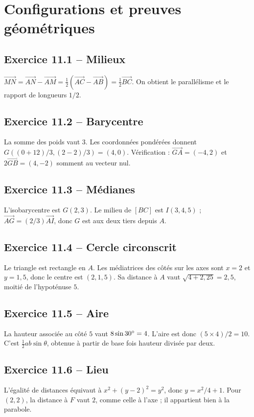 \chapter{Configurations et preuves géométriques}
\section*{Exercice 11.1 -- Milieux}
$\overrightarrow{MN}=\overrightarrow{AN}-\overrightarrow{AM}=\tfrac12(\overrightarrow{AC}-\overrightarrow{AB})=\tfrac12\overrightarrow{BC}$. On obtient le parallélisme et le rapport de longueurs $1/2$.

\section*{Exercice 11.2 -- Barycentre}
La somme des poids vaut $3$. Les coordonnées pondérées donnent $G((0+12)/3,(2-2)/3)=(4,0)$. Vérification : $\overrightarrow{GA}=(-4,2)$ et $2\overrightarrow{GB}=(4,-2)$ somment au vecteur nul.

\section*{Exercice 11.3 -- Médianes}
L'isobarycentre est $G(2,3)$. Le milieu de $[BC]$ est $I(3,4{,}5)$ ; $\overrightarrow{AG}=(2/3)\overrightarrow{AI}$, donc $G$ est aux deux tiers depuis $A$.

\section*{Exercice 11.4 -- Cercle circonscrit}
Le triangle est rectangle en $A$. Les médiatrices des côtés sur les axes sont $x=2$ et $y=1{,}5$, donc le centre est $(2,1{,}5)$. Sa distance à $A$ vaut $\sqrt{4+2{,}25}=2{,}5$, moitié de l'hypoténuse $5$.

\section*{Exercice 11.5 -- Aire}
La hauteur associée au côté $5$ vaut $8\sin30^{\circ}=4$. L'aire est donc $(5\times4)/2=10$. C'est $\frac12 ab\sin\theta$, obtenue à partir de base fois hauteur divisée par deux.

\section*{Exercice 11.6 -- Lieu}
L'égalité de distances équivaut à $x^2+(y-2)^2=y^2$, donc $y=x^2/4+1$. Pour $(2,2)$, la distance à $F$ vaut $2$, comme celle à l'axe ; il appartient bien à la parabole.

